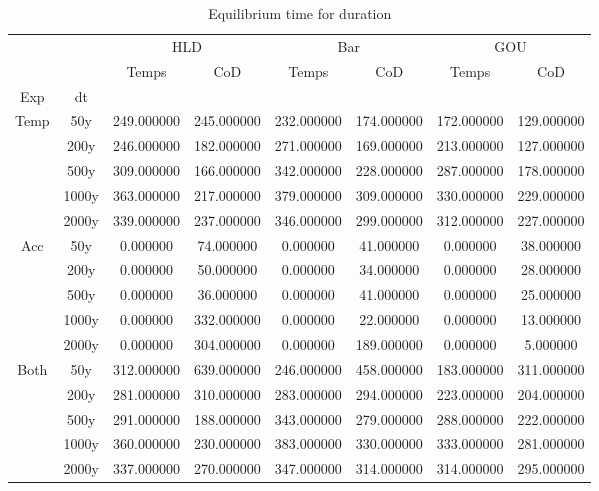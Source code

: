 \begin{table}[h]
\centering
\caption{Equilibrium time for duration}
\label{table:5}
\begin{tabular}{cccccccc}
\toprule
{} & {} & \multicolumn{2}{c}{HLD} & \multicolumn{2}{c}{Bar} & \multicolumn{2}{c}{GOU} \\
{} & {} & {Temps} & {CoD} & {Temps} & {CoD} & {Temps} & {CoD} \\
{Exp} & {dt} & {} & {} & {} & {} & {} & {} \\
\midrule
\multirow[c]{5}{*}{Temp} & 50y & 249.000000 & 245.000000 & 232.000000 & 174.000000 & 172.000000 & 129.000000 \\
 & 200y & 246.000000 & 182.000000 & 271.000000 & 169.000000 & 213.000000 & 127.000000 \\
 & 500y & 309.000000 & 166.000000 & 342.000000 & 228.000000 & 287.000000 & 178.000000 \\
 & 1000y & 363.000000 & 217.000000 & 379.000000 & 309.000000 & 330.000000 & 229.000000 \\
 & 2000y & 339.000000 & 237.000000 & 346.000000 & 299.000000 & 312.000000 & 227.000000 \\
\multirow[c]{5}{*}{Acc} & 50y & 0.000000 & 74.000000 & 0.000000 & 41.000000 & 0.000000 & 38.000000 \\
 & 200y & 0.000000 & 50.000000 & 0.000000 & 34.000000 & 0.000000 & 28.000000 \\
 & 500y & 0.000000 & 36.000000 & 0.000000 & 41.000000 & 0.000000 & 25.000000 \\
 & 1000y & 0.000000 & 332.000000 & 0.000000 & 22.000000 & 0.000000 & 13.000000 \\
 & 2000y & 0.000000 & 304.000000 & 0.000000 & 189.000000 & 0.000000 & 5.000000 \\
\multirow[c]{5}{*}{Both} & 50y & 312.000000 & 639.000000 & 246.000000 & 458.000000 & 183.000000 & 311.000000 \\
 & 200y & 281.000000 & 310.000000 & 283.000000 & 294.000000 & 223.000000 & 204.000000 \\
 & 500y & 291.000000 & 188.000000 & 343.000000 & 279.000000 & 288.000000 & 222.000000 \\
 & 1000y & 360.000000 & 230.000000 & 383.000000 & 330.000000 & 333.000000 & 281.000000 \\
 & 2000y & 337.000000 & 270.000000 & 347.000000 & 314.000000 & 314.000000 & 295.000000 \\
\bottomrule
\end{tabular}
\end{table}
